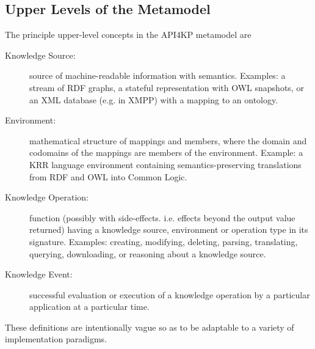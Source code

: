 \documentclass[runningheads]{llncs}
\begin{document}
\subsection{Upper Levels of the Metamodel}
\label{sec:upper}
The principle upper-level concepts in the API4KP metamodel are
\begin{description}
\item[Knowledge Source:] source of machine-readable information with semantics. Examples: a stream of RDF graphs, a stateful representation with OWL snapshots, or an XML database (e.g. in XMPP) with a mapping to an ontology.
\item[Environment:] mathematical structure of mappings and members, where the domain and codomains of the mappings are members of the environment.  Example: a KRR language environment containing semantics-preserving translations from RDF and OWL into Common Logic.
\item[Knowledge Operation:] function (possibly with side-effects. i.e. effects beyond the output value returned) having a knowledge source, environment or operation type in its signature. Examples: creating, modifying, deleting, parsing, translating, querying, downloading, or reasoning about a knowledge source.
\item[Knowledge Event:] successful evaluation or execution of a knowledge operation by a particular application at a particular time.
\end{description}
These definitions are intentionally vague so as to be adaptable to a variety of implementation paradigms.
\end{document}
